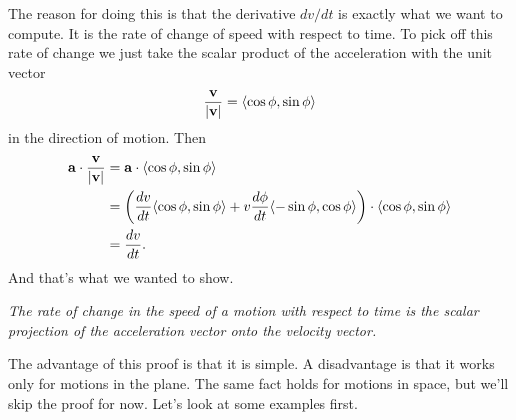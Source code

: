 \documentclass{ximera}
\begin{document}
The reason for doing this is that the derivative $dv/dt$ is exactly what we want to compute. It is the rate of change of speed with respect to time. To pick off this rate of change we just take the scalar product of the acceleration with the unit vector
\[
   \frac{{\bf v}}{|{\bf v}|} = \langle \cos\phi, \sin \phi \rangle
\]
in the direction of motion. Then
\begin{align*}
{\bf a} \cdot \frac{{\bf v}}{|{\bf v}|} &= {\bf a} \cdot \langle \cos\phi, \sin \phi \rangle \\
 & = \left(     \frac{dv}{dt} \langle \cos\phi, \sin\phi \rangle + v \frac{d\phi}{dt} \langle -\sin\phi, \cos \phi \rangle      \right) \cdot \langle \cos\phi, \sin \phi \rangle \\
                    & = \frac{dv}{dt} .
\end{align*} 
And that's what we wanted to show.

\emph{The rate of change in the speed of a motion with respect to time is the scalar projection of the acceleration vector onto the velocity vector.}

The advantage of this proof is that it is simple. A disadvantage is that it works only for motions in the plane. The same fact holds for motions in space, but we'll skip the proof for now. Let's look at some examples first.
\end{document}
